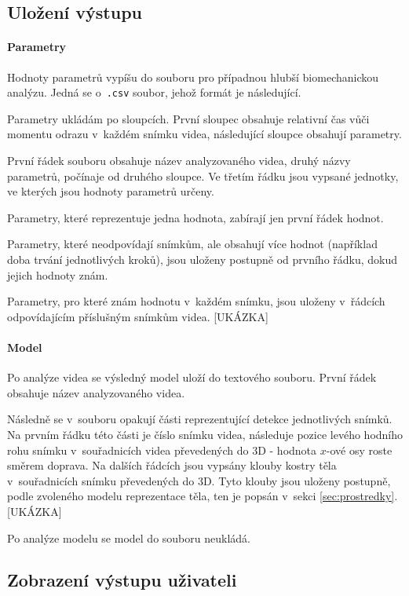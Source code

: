 \subsection{Uložení výstupu}
\label{ssec:ulozeni}

\paragraph{Parametry}

Hodnoty parametrů vypíšu do souboru pro případnou hlubší biomechanickou analýzu. Jedná se o~\texttt{.csv} soubor, jehož formát je následující.

Parametry ukládám po sloupcích. První sloupec obsahuje relativní čas vůči momentu odrazu v~každém snímku videa, následující sloupce obsahují parametry.

První řádek souboru obsahuje název analyzovaného videa, druhý názvy parametrů, počínaje od druhého sloupce. Ve třetím řádku jsou vypsané jednotky, ve kterých jsou hodnoty parametrů určeny.

Parametry, které reprezentuje jedna hodnota, zabírají jen první řádek hodnot.

Parametry, které neodpovídají snímkům, ale obsahují více hodnot (například doba trvání jednotlivých kroků), jsou uloženy postupně od prvního řádku, dokud jejich hodnoty znám.

Parametry, pro které znám hodnotu v~každém snímku, jsou uloženy v~řádcích odpovídajícím příslušným snímkům videa.
[UKÁZKA]

\paragraph{Model}

Po analýze videa se výsledný model uloží do textového souboru. První řádek obsahuje název analyzovaného videa.

Následně se v~souboru opakují části reprezentující detekce jednotlivých snímků. Na prvním řádku této části je číslo snímku videa, následuje pozice levého hodního rohu snímku v~souřadnicích videa převedených do 3D - hodnota $x$-ové osy roste směrem doprava. Na dalších řádcích jsou vypsány klouby kostry těla v~souřadnicích snímku převedených do 3D. Tyto klouby jsou uloženy postupně, podle zvoleného modelu reprezentace těla, ten je popsán v~sekci \ref{sec:prostredky}. [UKÁZKA]

Po analýze modelu se model do souboru neukládá.


\subsection{Zobrazení výstupu uživateli}

